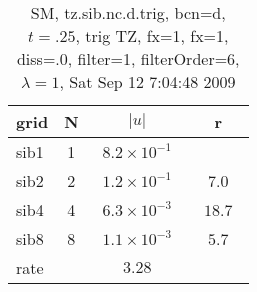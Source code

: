 \begin{table}[hbt]\tableFont %
\begin{center}
\begin{tabular}{|l|c|c|c|} \hline 
grid  & N &  $\vert u \vert$   & r \\ \hline 
                sib1 &     1 & ~$8.2\times10^{ -1}$~ &            \\ \hline
                sib2 &     2 & ~$1.2\times10^{ -1}$~ & ~$  7.0$~  \\ \hline
                sib4 &     4 & ~$6.3\times10^{ -3}$~ & ~$ 18.7$~  \\ \hline
                sib8 &     8 & ~$1.1\times10^{ -3}$~ & ~$  5.7$~  \\ \hline
    rate             &       &       $3.28$         &        \\ \hline
\end{tabular}
\caption{SM, tz.sib.nc.d.trig, bcn=d, $t=.25$, trig TZ, fx=1, fx=1, diss=.0, filter=1, filterOrder=6, $\lambda=1$, Sat Sep 12  7:04:48 2009}\label{table:tz.sib.nc.d.trig}
\end{center}
\end{table}
